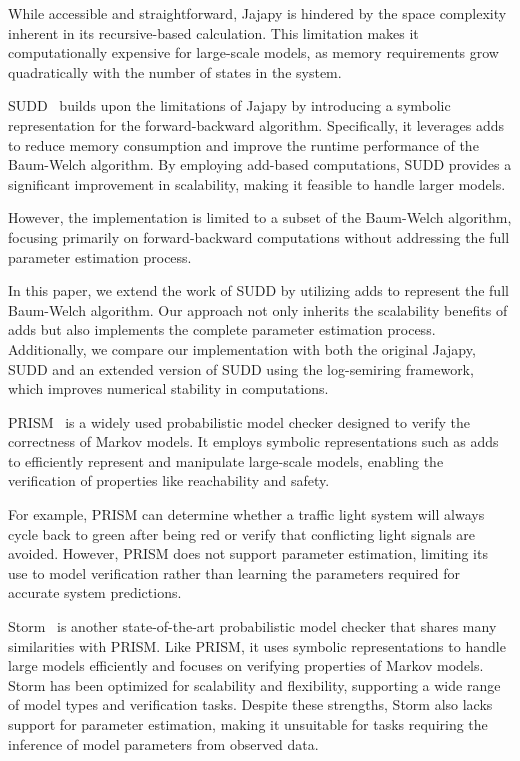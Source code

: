 While accessible and straightforward, Jajapy is hindered by the space complexity inherent in its recursive-based calculation.
This limitation makes it computationally expensive for large-scale models, as memory requirements grow quadratically with the number of states in the system.

SUDD~\cite{p7} builds upon the limitations of Jajapy by introducing a symbolic representation for the forward-backward algorithm.
Specifically, it leverages \glspl{add} to reduce memory consumption and improve the runtime performance of the Baum-Welch algorithm.
By employing \gls{add}-based computations, SUDD provides a significant improvement in scalability, making it feasible to handle larger models.

However, the implementation is limited to a subset of the Baum-Welch algorithm, focusing primarily on forward-backward computations without addressing the full parameter estimation process.

In this paper, we extend the work of SUDD by utilizing \glspl{add} to represent the full Baum-Welch algorithm.
Our approach not only inherits the scalability benefits of \glspl{add} but also implements the complete parameter estimation process.
Additionally, we compare our implementation with both the original Jajapy, SUDD and an extended version of SUDD using the log-semiring framework, which improves numerical stability in computations.

PRISM~\cite{kwiatkowska2011prism} is a widely used probabilistic model checker designed to verify the correctness of Markov models.
It employs symbolic representations such as \glspl{add} to efficiently represent and manipulate large-scale models, enabling the verification of properties like reachability and safety.

For example, PRISM can determine whether a traffic light system will always cycle back to green after being red or verify that conflicting light signals are avoided.
However, PRISM does not support parameter estimation, limiting its use to model verification rather than learning the parameters required for accurate system predictions.

Storm~\cite{hensel2021probabilistic} is another state-of-the-art probabilistic model checker that shares many similarities with PRISM\@.
Like PRISM, it uses symbolic representations to handle large models efficiently and focuses on verifying properties of Markov models.
Storm has been optimized for scalability and flexibility, supporting a wide range of model types and verification tasks.
Despite these strengths, Storm also lacks support for parameter estimation, making it unsuitable for tasks requiring the inference of model parameters from observed data.

